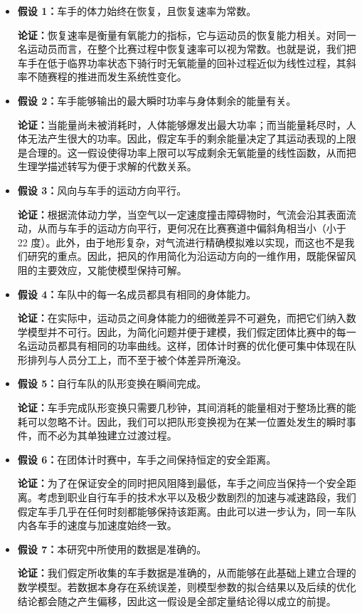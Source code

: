 \documentclass[11pt,a4paper]{ctexart}
\begin{document}
\begin{itemize}
\item \textbf{假设 1：}车手的体力始终在恢复，且恢复速率为常数。

\textbf{论证：}恢复速率是衡量有氧能力的指标，它与运动员的恢复能力相关。对同一名运动员而言，在整个比赛过程中恢复速率可以视为常数。也就是说，我们把车手在低于临界功率状态下骑行时无氧能量的回补过程近似为线性过程，其斜率不随赛程的推进而发生系统性变化。

\item \textbf{假设 2：}车手能够输出的最大瞬时功率与身体剩余的能量有关。

\textbf{论证：}当能量尚未被消耗时，人体能够爆发出最大功率；而当能量耗尽时，人体无法产生很大的功率。因此，假定车手的剩余能量决定了其运动表现的上限是合理的。这一假设使得功率上限可以写成剩余无氧能量的线性函数，从而把生理学描述转写为便于求解的代数关系。

\item \textbf{假设 3：}风向与车手的运动方向平行。

\textbf{论证：}根据流体动力学，当空气以一定速度撞击障碍物时，气流会沿其表面流动，从而与车手的运动方向平行，更何况在比赛赛道中偏斜角相当小（小于 22 度）。此外，由于地形复杂，对气流进行精确模拟难以实现，而这也不是我们研究的重点。因此，把风的作用简化为沿运动方向的一维作用，既能保留风阻的主要效应，又能使模型保持可解。

\item \textbf{假设 4：}车队中的每一名成员都具有相同的身体能力。

\textbf{论证：}在实际中，运动员之间身体能力的细微差异不可避免，而把它们纳入数学模型并不可行。因此，为简化问题并便于建模，我们假定团体比赛中的每一名运动员都具有相同的功率曲线。这样，团体计时赛的优化便可集中体现在队形排列与人员分工上，而不至于被个体差异所淹没。

\item \textbf{假设 5：}自行车队的队形变换在瞬间完成。

\textbf{论证：}车手完成队形变换只需要几秒钟，其间消耗的能量相对于整场比赛的能耗可以忽略不计。因此，我们可以把队形变换视为在某一位置处发生的瞬时事件，而不必为其单独建立过渡过程。

\item \textbf{假设 6：}在团体计时赛中，车手之间保持恒定的安全距离。

\textbf{论证：}为了在保证安全的同时把风阻降到最低，车手之间应当保持一个安全距离。考虑到职业自行车手的技术水平以及极少数剧烈的加速与减速路段，我们假定车手几乎在任何时刻都能够保持该距离。由此可以进一步认为，同一车队内各车手的速度与加速度始终一致。

\item \textbf{假设 7：}本研究中所使用的数据是准确的。

\textbf{论证：}我们假定所收集的车手数据是准确的，从而能够在此基础上建立合理的数学模型。若数据本身存在系统误差，则模型参数的拟合结果以及后续的优化结论都会随之产生偏移，因此这一假设是全部定量结论得以成立的前提。
\end{itemize}
\end{document}

